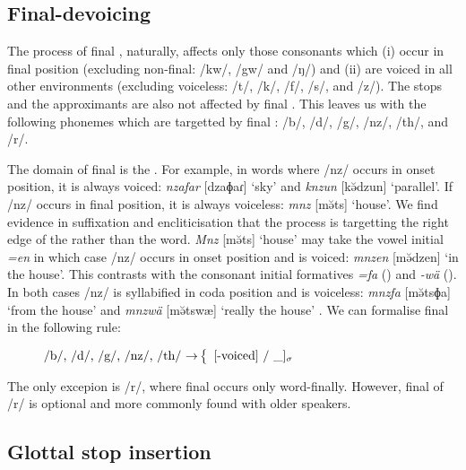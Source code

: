 \subsection{Final-devoicing} \label{final-devoicing-section}

The process of final , naturally, affects only those consonants which (i) occur in final position (excluding non-final: /kw/, /gw/ and /ŋ/) and (ii) are voiced in all other environments (excluding voiceless: /t/, /k/, /f/, /s/, and /z/). The  stops and the approximants are also not affected by final . This leaves us with the following phonemes which are targetted by final : /b/, /d/, /g/, /nz/, /th/, and /r/.%

The domain of final  is the . For example, in words where /nz/ occurs in onset position, it is always voiced: \emph{nzafar} [dzaɸaɾ] `sky' and \emph{knzun} [kə̆dzun] `parallel'. If /nz/ occurs in final position, it is always voiceless: \emph{mnz} [mə̆ts] `house'. We find evidence in suffixation and encliticisation that the process is targetting the right edge of the  rather than the word. \emph{Mnz} [mə̆ts] `house' may take the vowel initial   \emph{=en} in which case /nz/ occurs in onset position and is voiced: \emph{mnzen} [mə̆dzen] `in the house'. This contrasts with the consonant initial formatives \emph{=fa} (\Abl) and \emph{-wä} (\Emph). In both cases /nz/ is syllabified in coda position and is voiceless: \emph{mnzfa} [mə̆tsɸa] `from the house' and \emph{mnzwä} [mə̆tswæ] `really the house' . We can formalise final  in the following rule:

\begin{figure}
\centering
$\mbox{/b/, /d/, /g/, /nz/, /th/ $\rightarrow$} \left\{
\begin{array}{l}
  \parbox{3,75cm}{[-voiced] / \_]\textsubscript{$\sigma$}} \\
\end{array}
\right.$
\end{figure}%

The only excepion is /r/, where final  occurs only word-finally. However, final  of /r/ is optional and more commonly found with older speakers.

\subsection{Glottal stop insertion} \label{glottal-stop-insertion-section}

